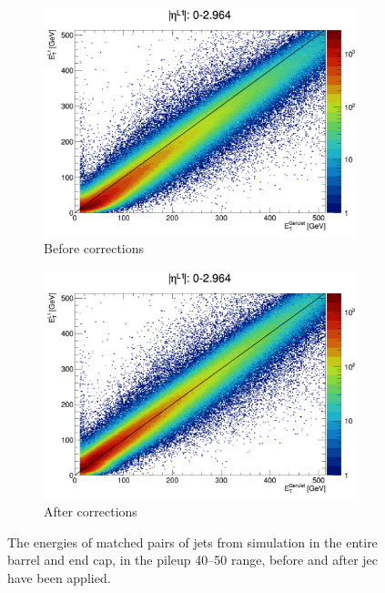 \begin{figure}[htbp]
    \centering
    \begin{subfigure}[b]{0.59\textwidth}
        \includegraphics[width=\textwidth]{./figures/jecs/scatterPlotBeforeBE.pdf}
        \caption{Before corrections}
        \label{fig:detector_jecs_scatter_before_BE}
    \end{subfigure}

    \begin{subfigure}[b]{0.59\textwidth}
        \includegraphics[width=\textwidth]{./figures/jecs/scatterPlotAfterBE.pdf}
        \caption{After corrections}
        \label{fig:detector_jecs_scatter_after_BE}
    \end{subfigure}
\caption[The energies of matched pairs of jets from simulation in the entire barrel and end cap, in the pileup 40--50 range, before and after jet energy corrections have been applied]{The energies of matched pairs of \glspl{jet} from simulation in the entire barrel and end cap, in the \gls{pileup} 40--50 range, before and after \acrlong{jec} have been applied.}
\label{fig:detector_jecs_scatter_BE}
\end{figure}


